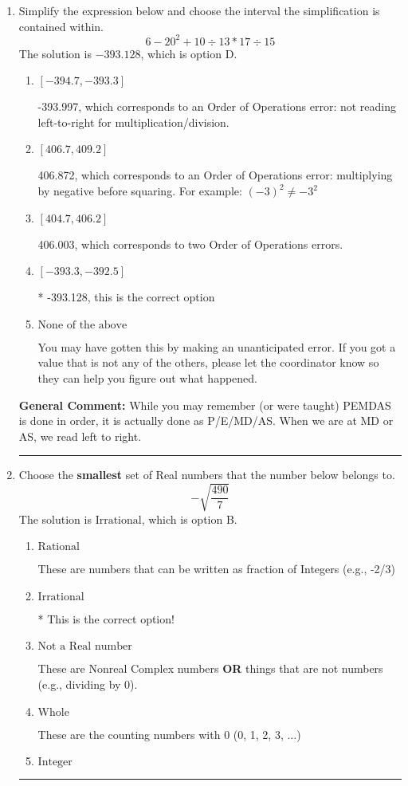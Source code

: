 \documentclass{extbook}[14pt]
\newcommand{\litem}[1]{\item #1

\rule{\textwidth}{0.4pt}}
\begin{document}
\begin{enumerate}\litem{
Simplify the expression below and choose the interval the simplification is contained within.
\[ 6 - 20^2 + 10 \div 13 * 17 \div 15 \]
The solution is \( -393.128 \), which is option D.\begin{enumerate}[label=\Alph*.]
\item \( [-394.7, -393.3] \)

 -393.997, which corresponds to an Order of Operations error: not reading left-to-right for multiplication/division.
\item \( [406.7, 409.2] \)

 406.872, which corresponds to an Order of Operations error: multiplying by negative before squaring. For example: $(-3)^2 \neq -3^2$
\item \( [404.7, 406.2] \)

 406.003, which corresponds to two Order of Operations errors.
\item \( [-393.3, -392.5] \)

* -393.128, this is the correct option
\item \( \text{None of the above} \)

 You may have gotten this by making an unanticipated error. If you got a value that is not any of the others, please let the coordinator know so they can help you figure out what happened.
\end{enumerate}

\textbf{General Comment:} While you may remember (or were taught) PEMDAS is done in order, it is actually done as P/E/MD/AS. When we are at MD or AS, we read left to right.
}
\litem{
Choose the \textbf{smallest} set of Real numbers that the number below belongs to.
\[ -\sqrt{\frac{490}{7}} \]
The solution is \( \text{Irrational} \), which is option B.\begin{enumerate}[label=\Alph*.]
\item \( \text{Rational} \)

These are numbers that can be written as fraction of Integers (e.g., -2/3)
\item \( \text{Irrational} \)

* This is the correct option!
\item \( \text{Not a Real number} \)

These are Nonreal Complex numbers \textbf{OR} things that are not numbers (e.g., dividing by 0).
\item \( \text{Whole} \)

These are the counting numbers with 0 (0, 1, 2, 3, ...)
\item \( \text{Integer} \)


\end{enumerate}}
\end{enumerate}
\end{document}
